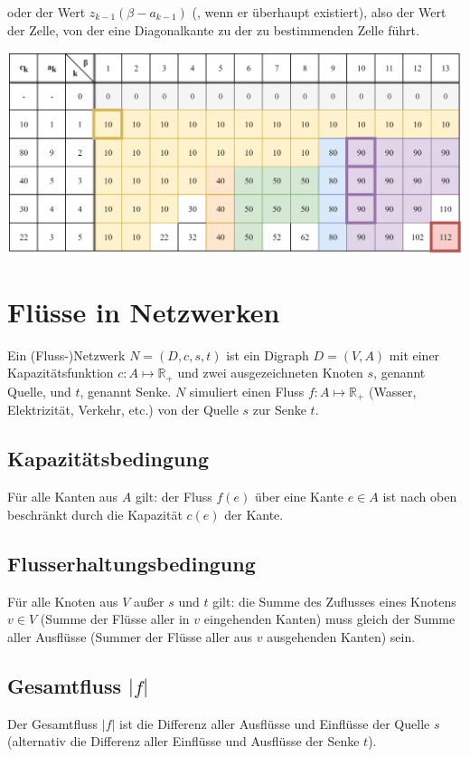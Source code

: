 \documentclass[10pt,a4paper,landscape]{article}
\begin{document}
\begin{multicols*}{2}
    oder der Wert $z_{k-1}(\beta-a_{k-1})$ (, wenn er überhaupt existiert), also der Wert der Zelle, von der eine Diagonalkante zu der zu bestimmenden Zelle führt.   
    \begin{center}
        \includegraphics[width=0.95\linewidth,keepaspectratio]{KSP.png}
    \end{center}
    

\section{ Flüsse in Netzwerken }
    Ein (Fluss-)Netzwerk $N = (D,c,s,t)$ ist ein Digraph $D = (V,A)$ mit einer Kapazitätsfunktion $c: A \mapsto \mathbb{R}_+$ und zwei ausgezeichneten 
    Knoten $s$, genannt Quelle, und $t$, genannt Senke. $N$ simuliert einen Fluss $f: A \mapsto \mathbb{R}_+$ (Wasser, Elektrizität, Verkehr, etc.) 
    von der Quelle $s$ zur Senke $t$.

    \subsection*{ Kapazitätsbedingung }
    Für alle Kanten aus $A$ gilt: der Fluss $f(e)$ über eine Kante $e \in A$ ist nach oben beschränkt durch die Kapazität $c(e)$ der Kante.
    
    \subsection*{ Flusserhaltungsbedingung }
    Für alle Knoten aus $V$ außer $s$ und $t$ gilt: die Summe des Zuflusses eines Knotens $v \in V$ (Summe der Flüsse aller in $v$ eingehenden Kanten) muss gleich der Summe aller 
    Ausflüsse (Summer der Flüsse aller aus $v$ ausgehenden Kanten) sein.

    \subsection*{ Gesamtfluss $|f|$ }
    Der Gesamtfluss $|f|$ ist die Differenz aller Ausflüsse und Einflüsse der Quelle $s$ (alternativ die Differenz aller Einflüsse und 
    Ausflüsse der Senke $t$).


\end{multicols*}
\end{document}
